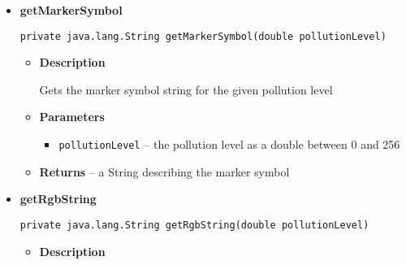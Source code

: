 \documentclass[11pt,a4paper]{report}
\begin{document}
{{{{{{{{{\begin{itemize}
{\begin{itemize}
{Create a Feature with a position, colour, and marker symbol.
}
\item{
{\bf  Parameters}
  \begin{itemize}
   \item{
\texttt{w3w} -- the W3W location of the sensor}
   \item{
\texttt{rgbString} -- the RGB colour string of the point}
   \item{
\texttt{markerSymbol} -- the marker symbol string}
  \end{itemize}
}%
\item{{\bf  Returns} -- 
a Feature containing a Point 
}%
\end{itemize}
}%
\item{ 
\hypertarget{uk.ac.ed.inf.aqmaps.SensorMarkerFactory.getMarkerSymbol(double)}{{\bf  getMarkerSymbol}\\}
\begin{lstlisting}[frame=none]
private java.lang.String getMarkerSymbol(double pollutionLevel)\end{lstlisting} %
\begin{itemize}
\item{
{\bf  Description}

Gets the marker symbol string for the given pollution level
}
\item{
{\bf  Parameters}
  \begin{itemize}
   \item{
\texttt{pollutionLevel} -- the pollution level as a double between 0 and 256}
  \end{itemize}
}%
\item{{\bf  Returns} -- 
a String describing the marker symbol 
}%
\end{itemize}
}%
\item{ 
\hypertarget{uk.ac.ed.inf.aqmaps.SensorMarkerFactory.getRgbString(double)}{{\bf  getRgbString}\\}
\begin{lstlisting}[frame=none]
private java.lang.String getRgbString(double pollutionLevel)\end{lstlisting} %
\begin{itemize}
\item{
{\bf  Description}

}
\end{itemize}}
\end{itemize}}}}}}}}}}
\end{document}
